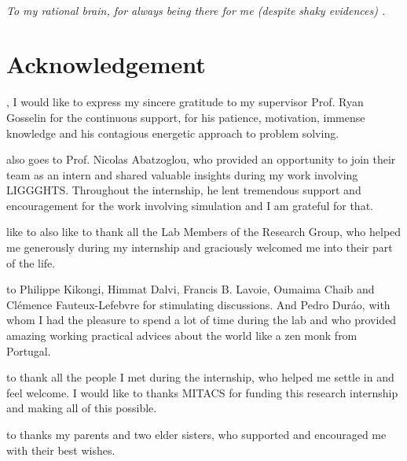 \documentclass{tufte-book} %
\begin{document}
~\vfill
\begin{doublespace}
\noindent\fontsize{18}{22}\selectfont\itshape
\nohyphenation
To my rational brain, for always being there for me (despite shaky evidences) .
\end{doublespace}
\vfill
\vfill



\chapter{Acknowledgement} %
\label{ch:0}

 , I would like to express my sincere gratitude to my supervisor Prof. Ryan Gosselin for the continuous support, for his patience, motivation, immense knowledge and his contagious energetic approach to problem solving.

  also goes to Prof. Nicolas Abatzoglou, who provided an opportunity to join their team as an intern and shared valuable insights during my work involving LIGGGHTS. Throughout the internship, he lent tremendous support and encouragement for the work involving simulation and I am grateful for that.  
 
  like to also like to thank all the Lab Members of the Research Group, who helped me generously during my internship and graciously welcomed me into their part of the life.

  to Philippe Kikongi, Himmat Dalvi, Francis B. Lavoie, Oumaima Chaib  and Cl\'emence Fauteux-Lefebvre for stimulating discussions. And Pedro Dur\'ao, with whom I had the pleasure to spend a lot of time during the lab and who provided amazing working practical advices about the world like a zen monk from Portugal.  

  to thank all the people I met during the internship, who helped me settle in and feel welcome. I would like to thanks MITACS for funding this research internship  and making all of this possible. 

  to thanks my parents and two elder sisters, who supported and encouraged me with their best wishes.   
\end{document}

